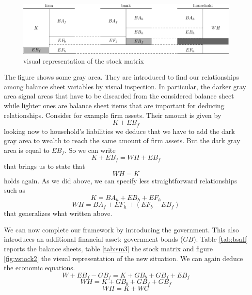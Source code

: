 \documentclass{article}
\begin{document}
\begin{figure}[t]
	\centering
\hskip-1cm
\includegraphics[scale=0.8]{balances-1.pdf}
	\caption{visual representation of the stock matrix}
	\label{fig:vstock1}
\end{figure}
The figure shows some gray area. They are introduced to find our relationships among balance sheet variables by visual inspection. In particular, the darker gray area signal areas that have to be discarded from the considered balance sheet while lighter ones are balance sheet items that are important for deducing relationships.  Consider for example firm assets. Their amount is given by
\[K+EB_{f}\]
looking now to household's liabilities we deduce that we have to add the dark gray area to wealth to reach the same amount of firm assets. But the dark gray area is equal to $EB_{f}$. So we can write
\[K+EB_{f}=WH+EB_{f}\]
that brings us to state that
\[WH=K\]
holds again. 
As we did above, we can specify less straightforward relationships such as
\[K=BA_h+EB_{h}+EF_{h}\]
\[
	WH=BA_f+EF_{h}+(EF_{b}-EB_{f})
\]
that generalizes what written above.

We can now complete our framework by introducing the government. This also introduces an additional financial asset: government bonds ($GB$). 
Table \ref{tab:bsall} reports the balance sheets, table \ref{tab:sm3} the stock matrix and figure \ref{fig:vstock2} the visual representation of the new situation. 
We can again deduce the economic equations.
\[W+EB_{f}-GB_{f}=K+GB_b+GB_f+EB_{f}\]
\[WH=K+GB_b+GB_f+GB_{f}\]
\[WH=K+WG\]
\end{document}

